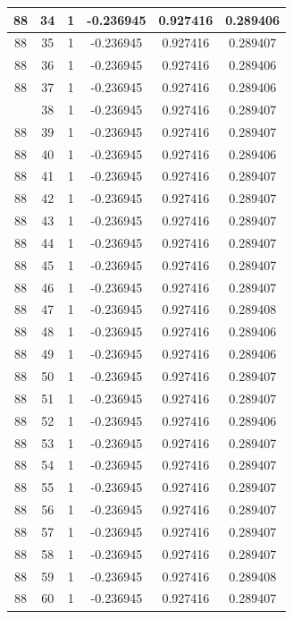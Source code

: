 \documentclass[12pt,a4paper]{article}
\numberwithin{equation}{section}
\numberwithin{figure}{section}
\numberwithin{table}{section}
\begin{document}
\begin{longtable}{|c|c|c|c|c|c|}
88 & 34 & 1 & -0.236945 & 0.927416 & 0.289406 \\ \hline
88 & 35 & 1 & -0.236945 & 0.927416 & 0.289407 \\ \hline
88 & 36 & 1 & -0.236945 & 0.927416 & 0.289406 \\ \hline
88 & 37 & 1 & -0.236945 & 0.927416 & 0.289406 \\ \hline
\pagebreak
88 & 38 & 1 & -0.236945 & 0.927416 & 0.289407 \\ \hline
88 & 39 & 1 & -0.236945 & 0.927416 & 0.289407 \\ \hline
88 & 40 & 1 & -0.236945 & 0.927416 & 0.289406 \\ \hline
88 & 41 & 1 & -0.236945 & 0.927416 & 0.289407 \\ \hline
88 & 42 & 1 & -0.236945 & 0.927416 & 0.289407 \\ \hline
88 & 43 & 1 & -0.236945 & 0.927416 & 0.289407 \\ \hline
88 & 44 & 1 & -0.236945 & 0.927416 & 0.289407 \\ \hline
88 & 45 & 1 & -0.236945 & 0.927416 & 0.289407 \\ \hline
88 & 46 & 1 & -0.236945 & 0.927416 & 0.289407 \\ \hline
88 & 47 & 1 & -0.236945 & 0.927416 & 0.289408 \\ \hline
88 & 48 & 1 & -0.236945 & 0.927416 & 0.289406 \\ \hline
88 & 49 & 1 & -0.236945 & 0.927416 & 0.289406 \\ \hline
88 & 50 & 1 & -0.236945 & 0.927416 & 0.289407 \\ \hline
88 & 51 & 1 & -0.236945 & 0.927416 & 0.289407 \\ \hline
88 & 52 & 1 & -0.236945 & 0.927416 & 0.289406 \\ \hline
88 & 53 & 1 & -0.236945 & 0.927416 & 0.289407 \\ \hline
88 & 54 & 1 & -0.236945 & 0.927416 & 0.289407 \\ \hline
88 & 55 & 1 & -0.236945 & 0.927416 & 0.289407 \\ \hline
88 & 56 & 1 & -0.236945 & 0.927416 & 0.289407 \\ \hline
88 & 57 & 1 & -0.236945 & 0.927416 & 0.289407 \\ \hline
88 & 58 & 1 & -0.236945 & 0.927416 & 0.289407 \\ \hline
88 & 59 & 1 & -0.236945 & 0.927416 & 0.289408 \\ \hline
88 & 60 & 1 & -0.236945 & 0.927416 & 0.289407 \\ \hline

\end{longtable}
\end{document}
